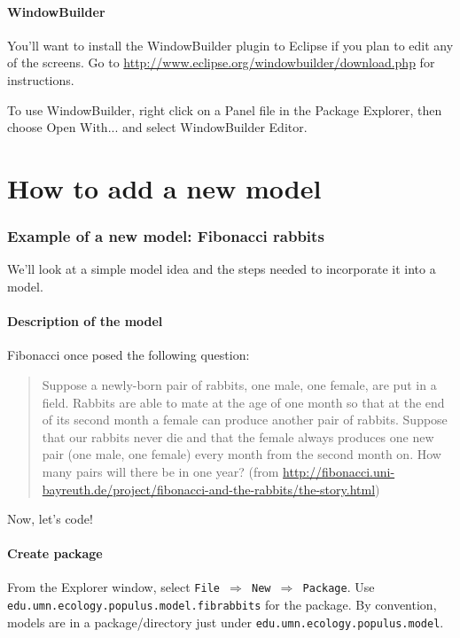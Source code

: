 \documentclass[12pt]{article}
\begin{document}
\subsection{WindowBuilder}
You'll want to install the WindowBuilder plugin to Eclipse if you plan to edit any of the screens.  Go to \url{http://www.eclipse.org/windowbuilder/download.php} for instructions.

To use WindowBuilder, right click on a Panel file in the Package Explorer, then choose Open With... and select WindowBuilder Editor.

\part{How to add a new model}
\section{Example of a new model: Fibonacci rabbits}

We'll look at a simple model idea and the steps needed to incorporate it into a model.

\subsection{Description of the model}
Fibonacci once posed the following question:

\begin{quote}
Suppose a newly-born pair of rabbits, one male, one female, are put in a field. Rabbits are able to mate at the age of one month so that at the end of its second month a female can produce another pair of rabbits. Suppose that our rabbits never die and that the female always produces one new pair (one male, one female) every month from the second month on. How many pairs will there be in one year?  (from \url{http://fibonacci.uni-bayreuth.de/project/fibonacci-and-the-rabbits/the-story.html})
\end{quote}

Now, let's code!

\subsection{Create package}
From the Explorer window, select \texttt{File $\Rightarrow$ New $\Rightarrow$ Package}.
Use \texttt{edu.umn.ecology.populus.model.fibrabbits} for the package.  By convention, models are in a package/directory just under \texttt{edu.umn.ecology.populus.model}.
\end{document}
